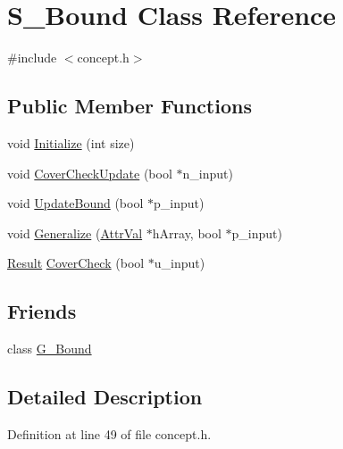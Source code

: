 \hypertarget{class_s___bound}{\section{S\-\_\-\-Bound Class Reference}
\label{class_s___bound}
}


{\ttfamily \#include $<$concept.\-h$>$}

\subsection*{Public Member Functions}
\begin{DoxyCompactItemize}
\item 
void \hyperlink{class_s___bound_abeb4548d8a255438173bda64849b0a4d}{Initialize} (int size)
\item 
void \hyperlink{class_s___bound_aee5a88ab73dd09ac42953b6f3545dfe2}{Cover\-Check\-Update} (bool $\ast$n\-\_\-input)
\item 
void \hyperlink{class_s___bound_a1391ba6c3f3fab3fd5fa57ecf8e1e66a}{Update\-Bound} (bool $\ast$p\-\_\-input)
\item 
void \hyperlink{class_s___bound_ae266bf5fa4d70959ce3b33ebe2d13dfa}{Generalize} (\hyperlink{concept_8h_a9680d29b8d997e4adbf99481b65e897d}{Attr\-Val} $\ast$h\-Array, bool $\ast$p\-\_\-input)
\item 
\hyperlink{concept_8h_a28287671eaf7406afd604bd055ba4066}{Result} \hyperlink{class_s___bound_ad42d2df371d817894fd44faff0eadd2f}{Cover\-Check} (bool $\ast$u\-\_\-input)
\end{DoxyCompactItemize}
\subsection*{Friends}
\begin{DoxyCompactItemize}
\item 
class \hyperlink{class_s___bound_ada6e422609483cdffa32ad88125d9f0d}{G\-\_\-\-Bound}
\end{DoxyCompactItemize}


\subsection{Detailed Description}


Definition at line 49 of file concept.\-h.



